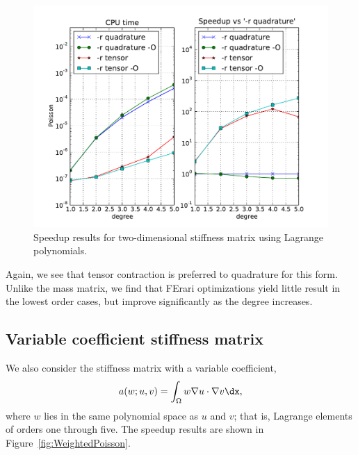 \begin{figure}
\bwfig
  \centering
  \includegraphics[width=\largefig]{chapters/kirby-3/pdf/Poisson.pdf}
  \caption{Speedup results for two-dimensional stiffness matrix using Lagrange polynomials.}
  \label{fig:Poisson}
\end{figure}

Again, we see that tensor contraction is preferred to quadrature for
this form. Unlike the mass matrix, we find that FErari optimizations
yield little result in the lowest order cases, but improve
significantly as the degree increases.

\subsection{Variable coefficient stiffness matrix}

We also consider the stiffness matrix with a variable coefficient,
\begin{equation}
  a(w; u, v) = \int_{\Omega} w \nabla u \cdot \nabla v \dx,
\end{equation}
where $ w $ lies in the same polynomial space as $ u $ and $ v$; that
is, Lagrange elements of orders one through five. The speedup results
are shown in Figure~\ref{fig:WeightedPoisson}.

